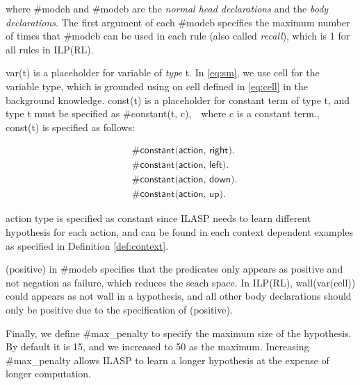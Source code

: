 where \textsf{\#modeh} and \textsf{\#modeb} are the \textit{normal head declarations} and the \textit{body declarations}. 
The first argument of each \textsf{\#modeb} specifies the maximum number of times that \textsf{\#modeb} can be used in each rule (also called \textit{recall}), which is 1 for all rules in ILP(RL).  

\textsf{var(t)} is a placeholder for variable of \textit{type} \textsf{t}. In \ref{eq:sm}, we use \textsf{cell} for the variable type, which is grounded using on \textsf{cell} defined in \ref{eq:cell} in the background knowledge.
\textsf{const(t)} is a placeholder for constant term of type \textsf{t}, and type \textsf{t} must be specified as \textsf{\#constant(t, c)},　where \textsf{c} is a constant term., 
const(t) is specified as follows:

\begin{equation}
\begin{split}
&\textsf{\#constant(action, right).}\\
&\textsf{\#constant(action, left).}\\
&\textsf{\#constant(action, down).}\\
&\textsf{\#constant(action, up).}
\end{split}
\end{equation}

\textsf{action} type is specified as constant since ILASP needs to learn different hypothesis for each action, 
and can be found in each context dependent examples as specified in Definition \ref{def:context}.

\textsf{(positive)} in \textsf{\#modeb} specifies that the predicates only appears as positive and not negation as failure, which reduces the seach space. 
In ILP(RL), \textsf{wall(var(cell))} could appears as \textsf{not wall} in a hypothesis, and all other body declarations should only be positive due to the specification of \textsf{(positive)}. 

Finally, we define \textsf{\#max\_penalty} to specify the maximum size of the hypothesis. By default it is 15, and we increased to 50 as the maximum.
Increasing \#max\_penalty allows ILASP to learn a longer hypothesis at the expense of longer computation.

